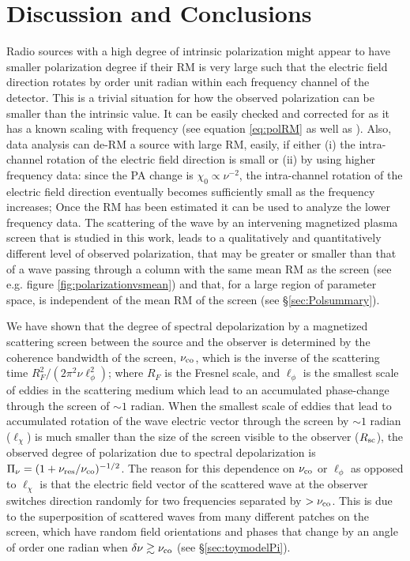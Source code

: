 \documentclass[fleqn,usenatbib]{mnras}
\begin{document}
	\section{Discussion and Conclusions}
	\label{sec:discuss}
	Radio sources with a high degree of intrinsic polarization might appear to have smaller polarization degree if their RM is very large such that the electric field direction rotates by order unit radian within each frequency channel of the detector. This is a trivial situation for how the observed polarization can be smaller than the intrinsic value. It can be easily checked and corrected for as it has a known scaling with frequency (see equation \ref{eq:polRM} as well as \citealt{VanStraten2002,Mckinven2021}). Also, data analysis can de-RM a source with large RM, easily, if either (i) the intra-channel rotation of the electric field direction is small or (ii) by using higher frequency data: since the PA change is $\chi_0\propto \nu^{-2}$, the intra-channel rotation of the electric field direction eventually becomes sufficiently small as the frequency increases; Once the RM has been estimated it can be used to analyze the lower frequency data. The scattering of the wave by an intervening magnetized plasma screen that is studied in this work, leads to a qualitatively and quantitatively different level of observed polarization, that may be greater or smaller than that of a wave passing through a column with the same mean RM as the screen (see e.g. figure \ref{fig:polarizationvsmean}) and that, for a large region of parameter space, is independent of the mean RM of the screen (see \S \ref{sec:Polsummary}). 
	
	We have shown that the degree of spectral depolarization by a magnetized scattering screen between the source and the observer is determined by the coherence bandwidth of the screen, $\nu_{\rm co}$, which is the inverse of the scattering time $R_F^2/(2\pi^2\nu\ell_\phi^2)$; where $R_F$ is the Fresnel scale, and $\ell_\phi$ is the smallest scale of eddies in the scattering medium which lead to an accumulated phase-change through the screen of $\sim 1$ radian. When the smallest scale of eddies that lead to accumulated rotation of the wave electric vector through the screen by $\sim 1$ radian ($\ell_\chi$) is much smaller than the size of the screen visible to the observer ($R_{\rm sc}$), the observed degree of polarization due to spectral depolarization is $\Pi_{\nu}=(1+ \nu_{\rm res}/\nu_{\rm co})^{-1/2}$. The reason for this dependence on $\nu_{\rm co}$ or $\ell_\phi$ as opposed to $\ell_\chi$ is that the electric field vector of the scattered wave at the observer switches direction randomly for two frequencies separated by $>\nu_{\rm co}$. This is due to the superposition of scattered waves from many different patches on the screen, which have random field orientations and phases that change by an angle of order one radian when $\delta\nu \gtrsim \nu_{\rm co}$ (see \S \ref{sec:toymodelPi}).
	
\end{document}
